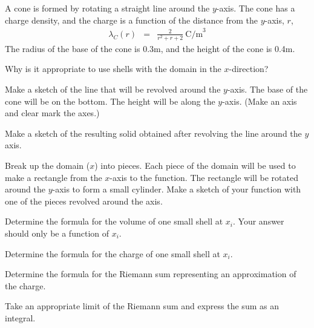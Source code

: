 \begin{problem}
  \item A cone is formed by rotating a straight line around the
    $y$-axis.  The cone has a charge density, and the charge is a
    function of the distance from the $y$-axis, $r$,
       \begin{eqnarray*}
         \lambda_C(r) & = & \frac{2}{r^2+r+2} ~ \mathrm{C/m}^3
       \end{eqnarray*}
       The radius of the base of the cone is 0.3m, and the height of
       the cone is 0.4m.
       \begin{subproblem}
         \item Why is it appropriate to use shells with the domain in
           the $x$-direction?
           \vfill
         \item
           Make a sketch of the line that will be revolved around the $y$-axis.
           The base of the cone will be on the bottom.
           The height will be along the $y$-axis.
           (Make an axis and clear mark the axes.)
           \vfill
           \vfill

         \item Make a sketch of the resulting solid obtained after
           revolving the line around the $y$ axis.
           \vfill

         \item Break up the domain ($x$) into pieces. Each piece of
           the domain will be used to make a rectangle from the
           $x$-axis to the function. The rectangle will be rotated
           around the $y$-axis to form a small cylinder.  Make a
           sketch of your function with one of the pieces revolved
           around the axis.  \vfill \vfill

         \clearpage

         \item Determine the formula for the volume of one small shell at $x_i$. Your answer should only be a function of $x_i$.
           \vfill

         \item Determine the formula for the charge of one small shell at $x_i$.
           \vfill

         \item Determine the formula for the Riemann sum representing an approximation of the charge.
           \vfill

         \item Take an appropriate limit of the Riemann sum and express the sum as an integral.
           \vfill

       \end{subproblem}
\end{problem}

